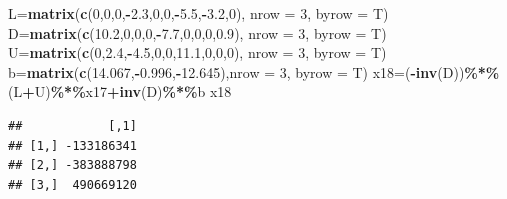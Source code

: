 \documentclass[
]{article}
\newenvironment{Shaded}{\begin{snugshade}}{\end{snugshade}}
\newcommand{\AttributeTok}[1]{\textcolor[rgb]{0.13,0.29,0.53}{#1}}
\newcommand{\DecValTok}[1]{\textcolor[rgb]{0.00,0.00,0.81}{#1}}
\newcommand{\FloatTok}[1]{\textcolor[rgb]{0.00,0.00,0.81}{#1}}
\newcommand{\FunctionTok}[1]{\textcolor[rgb]{0.13,0.29,0.53}{\textbf{#1}}}
\newcommand{\NormalTok}[1]{#1}
\newcommand{\OtherTok}[1]{\textcolor[rgb]{0.56,0.35,0.01}{#1}}
\newcommand{\SpecialCharTok}[1]{\textcolor[rgb]{0.81,0.36,0.00}{\textbf{#1}}}
\begin{document}
\begin{Shaded}
\begin{Highlighting}[]
\NormalTok{  L}\OtherTok{=}\FunctionTok{matrix}\NormalTok{(}\FunctionTok{c}\NormalTok{(}\DecValTok{0}\NormalTok{,}\DecValTok{0}\NormalTok{,}\DecValTok{0}\NormalTok{,}\SpecialCharTok{{-}}\FloatTok{2.3}\NormalTok{,}\DecValTok{0}\NormalTok{,}\DecValTok{0}\NormalTok{,}\SpecialCharTok{{-}}\FloatTok{5.5}\NormalTok{,}\SpecialCharTok{{-}}\FloatTok{3.2}\NormalTok{,}\DecValTok{0}\NormalTok{), }\AttributeTok{nrow =} \DecValTok{3}\NormalTok{, }\AttributeTok{byrow =}\NormalTok{ T)}
\NormalTok{  D}\OtherTok{=}\FunctionTok{matrix}\NormalTok{(}\FunctionTok{c}\NormalTok{(}\FloatTok{10.2}\NormalTok{,}\DecValTok{0}\NormalTok{,}\DecValTok{0}\NormalTok{,}\DecValTok{0}\NormalTok{,}\SpecialCharTok{{-}}\FloatTok{7.7}\NormalTok{,}\DecValTok{0}\NormalTok{,}\DecValTok{0}\NormalTok{,}\DecValTok{0}\NormalTok{,}\FloatTok{0.9}\NormalTok{), }\AttributeTok{nrow =} \DecValTok{3}\NormalTok{, }\AttributeTok{byrow =}\NormalTok{ T)}
\NormalTok{  U}\OtherTok{=}\FunctionTok{matrix}\NormalTok{(}\FunctionTok{c}\NormalTok{(}\DecValTok{0}\NormalTok{,}\FloatTok{2.4}\NormalTok{,}\SpecialCharTok{{-}}\FloatTok{4.5}\NormalTok{,}\DecValTok{0}\NormalTok{,}\DecValTok{0}\NormalTok{,}\FloatTok{11.1}\NormalTok{,}\DecValTok{0}\NormalTok{,}\DecValTok{0}\NormalTok{,}\DecValTok{0}\NormalTok{), }\AttributeTok{nrow =} \DecValTok{3}\NormalTok{, }\AttributeTok{byrow =}\NormalTok{ T)}
\NormalTok{  b}\OtherTok{=}\FunctionTok{matrix}\NormalTok{(}\FunctionTok{c}\NormalTok{(}\FloatTok{14.067}\NormalTok{,}\SpecialCharTok{{-}}\FloatTok{0.996}\NormalTok{,}\SpecialCharTok{{-}}\FloatTok{12.645}\NormalTok{),}\AttributeTok{nrow =} \DecValTok{3}\NormalTok{, }\AttributeTok{byrow =}\NormalTok{ T)}
\NormalTok{  x18}\OtherTok{=}\NormalTok{(}\SpecialCharTok{{-}}\FunctionTok{inv}\NormalTok{(D))}\SpecialCharTok{\%*\%}\NormalTok{(L}\SpecialCharTok{+}\NormalTok{U)}\SpecialCharTok{\%*\%}\NormalTok{x17}\SpecialCharTok{+}\FunctionTok{inv}\NormalTok{(D)}\SpecialCharTok{\%*\%}\NormalTok{b}
\NormalTok{  x18}
\end{Highlighting}
\end{Shaded}

\begin{verbatim}
##            [,1]
## [1,] -133186341
## [2,] -383888798
## [3,]  490669120
\end{verbatim}
\end{document}
